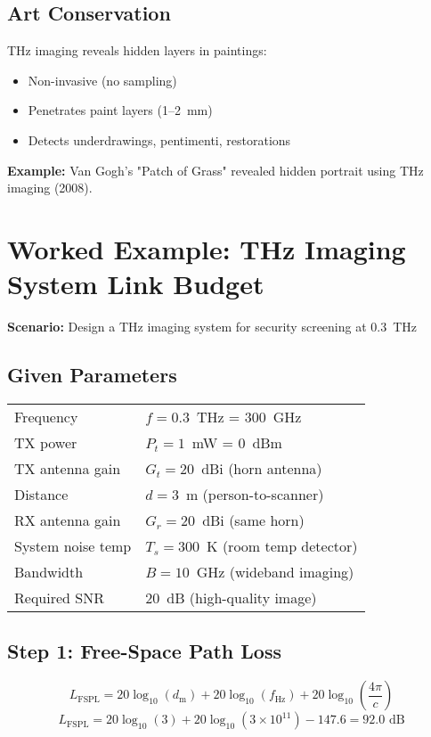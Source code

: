 \subsection{Art Conservation}

THz imaging reveals hidden layers in paintings:
\begin{itemize}
\item Non-invasive (no sampling)
\item Penetrates paint layers (1--2~mm)
\item Detects underdrawings, pentimenti, restorations
\end{itemize}

\textbf{Example:} Van Gogh's "Patch of Grass" revealed hidden portrait using THz imaging (2008).

\section{Worked Example: THz Imaging System Link Budget}

\textbf{Scenario:} Design a THz imaging system for security screening at 0.3~THz

\subsection*{Given Parameters}

\begin{tabular}{@{}ll@{}}
Frequency & $f = 0.3$~THz = 300~GHz \\
TX power & $P_t = 1$~mW = 0~dBm \\
TX antenna gain & $G_t = 20$~dBi (horn antenna) \\
Distance & $d = 3$~m (person-to-scanner) \\
RX antenna gain & $G_r = 20$~dBi (same horn) \\
System noise temp & $T_s = 300$~K (room temp detector) \\
Bandwidth & $B = 10$~GHz (wideband imaging) \\
Required SNR & 20~dB (high-quality image) \\
\end{tabular}

\subsection*{Step 1: Free-Space Path Loss}

\begin{equation}
L_{\text{FSPL}} = 20\log_{10}(d_{\text{m}}) + 20\log_{10}(f_{\text{Hz}}) + 20\log_{10}\left(\frac{4\pi}{c}\right)
\end{equation}
\begin{equation}
L_{\text{FSPL}} = 20\log_{10}(3) + 20\log_{10}(3 \times 10^{11}) - 147.6 = 92.0 \text{ dB}
\end{equation}

